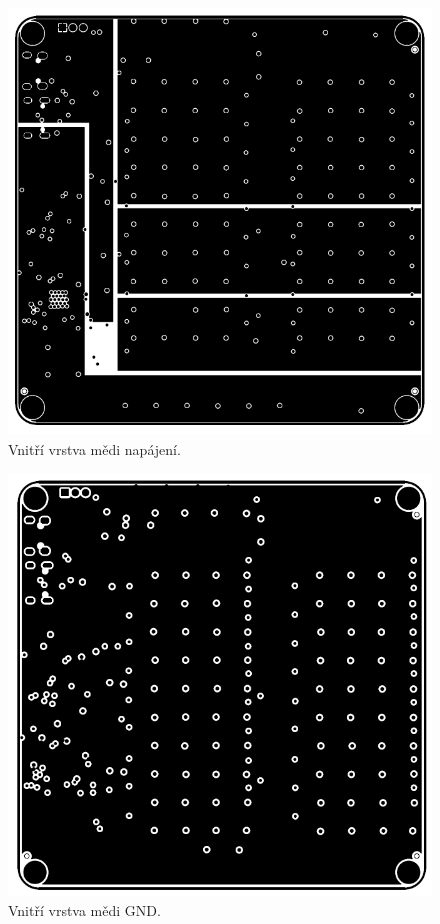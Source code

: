   \begin{figure}[!h]
    \begin{center}
      \includegraphics[scale=0.9]{prilohy/Verze2_vrstra_Cu_vnitrni_1.png}
    \end{center}
    \caption[Vnitří vrstva mědi napájení]{Vnitří vrstva mědi napájení.}
  \end{figure}

  \begin{figure}[!h]
    \begin{center}
      \includegraphics[scale=0.9]{prilohy/Verze2_vrstva_Cu_vnitrni_GND.png}
    \end{center}
    \caption[Vnitří vrstva mědi GND]{Vnitří vrstva mědi GND.}
  \end{figure}

